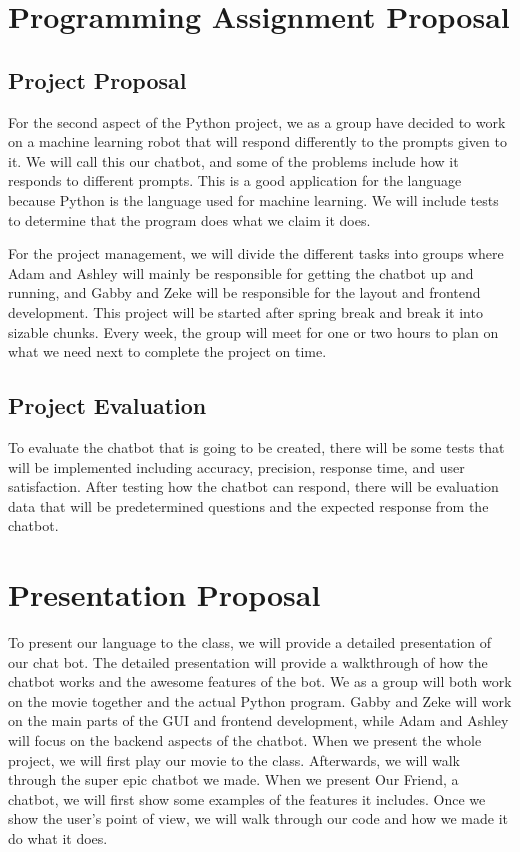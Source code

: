 \documentclass{article}
\begin{document}
\section{Programming Assignment Proposal}
\subsection{Project Proposal}
For the second aspect of the Python project, we as a group have decided to work on a machine learning robot 
that will respond differently to the prompts given to it. We will call this our chatbot, and some of the problems 
include how it responds to different prompts. This is a good application for the language because Python is the 
language used for machine learning. We will include tests to determine that the program does what we claim it does. 

For the project management, we will divide the different tasks into groups where Adam and Ashley will mainly be 
responsible for getting the chatbot up and running, and Gabby and Zeke will be responsible for the layout and frontend 
development. This project will be started after spring break and break it into sizable chunks. Every week, the 
group will meet for one or two hours to plan on what we need next to complete the project on time. 

\subsection{Project Evaluation}
To evaluate the chatbot that is going to be created, there will be some tests that will be implemented including 
accuracy, precision, response time, and user satisfaction. After testing how the chatbot can respond, there 
will be evaluation data that will be predetermined questions and the expected response from the chatbot. 

\section{Presentation Proposal}
To present our language to the class, we will provide a detailed presentation of our chat bot. The detailed
presentation will provide a walkthrough of how the chatbot works and the awesome features of the bot.
We as a group will both work on the movie together and the actual Python program. Gabby and Zeke will work on
the main parts of the GUI and frontend development, while Adam and Ashley will focus on the backend aspects of
the chatbot.
When we present the whole project, we will first play our movie to the class. Afterwards, we will
walk through the super epic chatbot we made. When we present Our Friend, a chatbot, we will first show some examples
of the features it includes. Once we show the user's point of view, we will walk through our code and how we made it do
what it does.

\printbibliography

\end{document}
